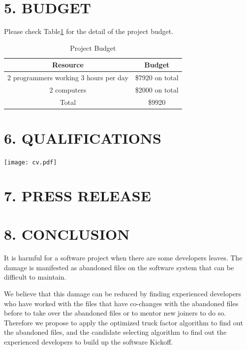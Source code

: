\documentclass[12pt, a4paper, openright]{report}
\begin{document}
\section* {5. BUDGET}
Please check Table\ref{budget} for the detail of the project budget.
\begin{table}[h]		
	\centering            
	\caption{Project Budget}            
	\begin{tabular}{|c|c|}            
		\hline Resource & Budget   \\ \hline
		2 programmers working 3 hours per day& \$7920 on total \\ \hline
        2 computers& \$2000 on total \\ \hline
        Total& \$9920  \\ \hline
	\end{tabular}            
	\label{budget}            
\end{table}

\newpage
\section* {6. QUALIFICATIONS}

\begin{center}
	\texttt{[image: cv.pdf]}
	\label{CV}
\end{center}

\section* {7. PRESS RELEASE}


\newpage
\section*{8. CONCLUSION}
It is harmful for a software project when there are some developers leaves. The damage is manifested as abandoned
files on the software system that can be difficult to maintain.

We believe that this damage can be reduced by finding experienced developers who have worked with the files that have co-changes with the abandoned files before to take over the abandoned files or to mentor new joiners to do so. Therefore we propose to apply the optimized truck factor algorithm to find out the abandoned files, and the candidate selecting algorithm to find out the experienced developers to build up the software Kickoff.
\end{document}
